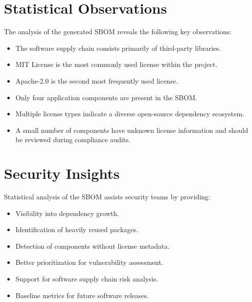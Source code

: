 \vspace{0.4cm}


\section{Statistical Observations}

The analysis of the generated SBOM reveals the following key observations:
\begin{itemize}
\item The software supply chain consists primarily of third-party libraries.
\item MIT License is the most commonly used license within the project.
\item Apache-2.0 is the second most frequently used license.
\item Only four application components are present in the SBOM.
\item Multiple license types indicate a diverse open-source dependency ecosystem.
\item A small number of components have unknown license information and should be reviewed during compliance audits.
\end{itemize}

\vspace{0.4cm}


\section{Security Insights}

Statistical analysis of the SBOM assists security teams by providing:
\begin{itemize}
\item Visibility into dependency growth.
\item Identification of heavily reused packages.
\item Detection of components without license metadata.
\item Better prioritization for vulnerability assessment.
\item Support for software supply chain risk analysis.
\item Baseline metrics for future software releases.
\end{itemize}

